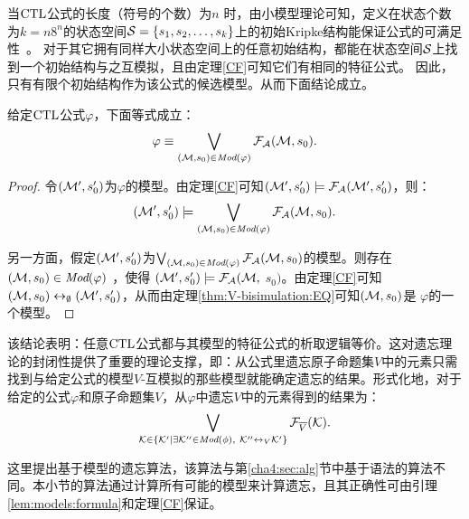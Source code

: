 当$\textrm{CTL}$公式的长度（符号的个数）为$n$ 时，由小模型理论可知，定义在状态个数为$k=n8^n$的状态空间${\cal S}=\{s_1,s_2,\dots, s_k\}$上的初始Kripke结构能保证公式的可满足性~\cite{DBLP:journals/jcss/EmersonH85}。
对于其它拥有同样大小状态空间上的任意初始结构，都能在状态空间${\cal S}$上找到一个初始结构与之互模拟，且由定理\ref{CF}可知它们有相同的特征公式。
因此，只有有限个初始结构作为该公式的候选模型。从而下面结论成立。

\begin{lemma}\label{lem:models:formula}
	给定$\textrm{CTL}$公式$\varphi$，下面等式成立：
	\begin{equation*}
		\varphi\equiv \bigvee_{({\cal M}, s_0)\in\textit{Mod}(\varphi)}{\cal F}_{\cal A}({\cal M}, s_0).
	\end{equation*}
\end{lemma}
\begin{proof}
	令$({\cal M}', s_0')$为$\varphi$的模型。由定理\ref{CF}可知$({\cal M}', s_0') \models {\cal F}_{{\cal A}}({\cal M}', s_0')$，则：
	$$({\cal M}', s_0') \models \bigvee_{({\cal M}, s_0)\in \textit{Mod}(\varphi)} {\cal F}_{{\cal A}}({\cal M}, s_0).$$
	
	另一方面，假定$({\cal M}', s_0')$为$\bigvee_{({\cal M}, s_0) \in \textit{Mod}(\varphi)} {\cal F}_{{\cal A}} ({\cal M}, s_0)$的模型。则存在$({\cal M}, s_0)\in \textit{Mod}(\varphi)$ ，使得 $({\cal M}', s_0') \models {\cal F}_{{\cal A}}({\cal M},$ $s_0)$。由定理\ref{CF}可知$({\cal M}, s_0) \leftrightarrow_{\emptyset} ({\cal M}', s_0')$，从而由定理\ref{thm:V-bisimulation:EQ}可知$({\cal M}, s_0)$是 $\varphi$的一个模型。
\end{proof}

该结论表明：任意$\textrm{CTL}$公式都与其模型的特征公式的析取逻辑等价。这对遗忘理论的封闭性提供了重要的理论支撑，即：从公式里遗忘原子命题集$V$中的元素只需找到与给定公式的模型$V$-互模拟的那些模型就能确定遗忘的结果。形式化地，对于给定的公式$\varphi$和原子命题集$V$，从$\varphi$中遗忘$V$中的元素得到的结果为：
\begin{equation*}
	\bigvee_{{\cal K}\in  \{{\cal K}'\mid \exists {\cal K}''\in\textit{Mod}(\phi),\ {\cal K}''\leftrightarrow_V{\cal K}'\}} {\cal F}_{\overline V}({\cal K}).
\end{equation*}

这里提出基于模型的遗忘算法，该算法与第\ref{cha4:sec:alg}节中基于语法的算法不同。本小节的算法通过计算所有可能的模型来计算遗忘，且其正确性可由引理\ref{lem:models:formula}和定理\ref{CF}保证。

